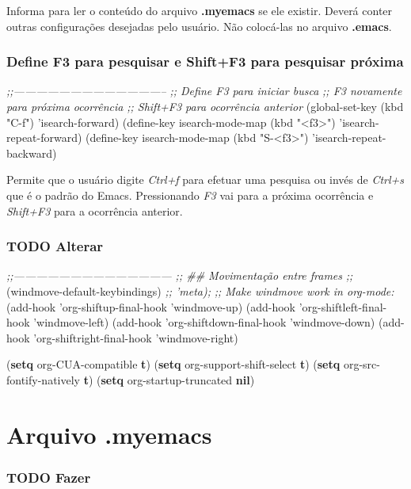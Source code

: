 \documentclass[]{article}
\newenvironment{Shaded}{}{}
\newcommand{\KeywordTok}[1]{\textcolor[rgb]{0.00,0.44,0.13}{\textbf{{#1}}}}
\newcommand{\StringTok}[1]{\textcolor[rgb]{0.25,0.44,0.63}{{#1}}}
\newcommand{\CommentTok}[1]{\textcolor[rgb]{0.38,0.63,0.69}{\textit{{#1}}}}
\newcommand{\NormalTok}[1]{{#1}}
\begin{document}
Informa para ler o conteúdo do arquivo \textbf{.myemacs} se ele existir.
Deverá conter outras configurações desejadas pelo usuário. Não
colocá-las no arquivo \textbf{.emacs}.

\subsubsection{Define F3 para pesquisar e Shift+F3 para pesquisar
próxima}\label{define-f3-para-pesquisar-e-shiftf3-para-pesquisar-pruxf3xima}

\begin{Shaded}
\begin{Highlighting}[]
\CommentTok{;;-----------------------------------------}
\CommentTok{;; Define F3 para iniciar busca}
\CommentTok{;; F3 novamente para próxima ocorrência}
\CommentTok{;; Shift+F3 para ocorrência anterior}
\NormalTok{(global-set-key (kbd }\StringTok{"C-f"}\NormalTok{) 'isearch-forward)}
\NormalTok{(define-key isearch-mode-map (kbd }\StringTok{"<f3>"}\NormalTok{) 'isearch-repeat-forward)}
\NormalTok{(define-key isearch-mode-map (kbd }\StringTok{"S-<f3>"}\NormalTok{) 'isearch-repeat-backward)}
\end{Highlighting}
\end{Shaded}

Permite que o usuário digite \emph{Ctrl+f} para efetuar uma pesquisa ou
invés de \emph{Ctrl+s} que é o padrão do Emacs. Pressionando \emph{F3}
vai para a próxima ocorrência e \emph{Shift+F3} para a ocorrência
anterior.

\subsubsection{TODO Alterar}\label{todo-alterar}

\begin{Shaded}
\begin{Highlighting}[]
\CommentTok{;;------------------------------------------}
\CommentTok{;; ## Movimentação entre frames}
\CommentTok{;;}
\NormalTok{(windmove-default-keybindings) }\CommentTok{;; 'meta);}
\CommentTok{;; Make windmove work in org-mode:}
\NormalTok{(add-hook 'org-shiftup-final-hook 'windmove-up)}
\NormalTok{(add-hook 'org-shiftleft-final-hook 'windmove-left)}
\NormalTok{(add-hook 'org-shiftdown-final-hook 'windmove-down)}
\NormalTok{(add-hook 'org-shiftright-final-hook 'windmove-right)}

\NormalTok{(}\KeywordTok{setq} \NormalTok{org-CUA-compatible }\KeywordTok{t}\NormalTok{)}
\NormalTok{(}\KeywordTok{setq} \NormalTok{org-support-shift-select }\KeywordTok{t}\NormalTok{)}
\NormalTok{(}\KeywordTok{setq} \NormalTok{org-src-fontify-natively }\KeywordTok{t}\NormalTok{)}
\NormalTok{(}\KeywordTok{setq} \NormalTok{org-startup-truncated }\KeywordTok{nil}\NormalTok{)}
\end{Highlighting}
\end{Shaded}

\section{Arquivo .myemacs}\label{arquivo-.myemacs}

\subsubsection{TODO Fazer}\label{todo-fazer}
\end{document}
